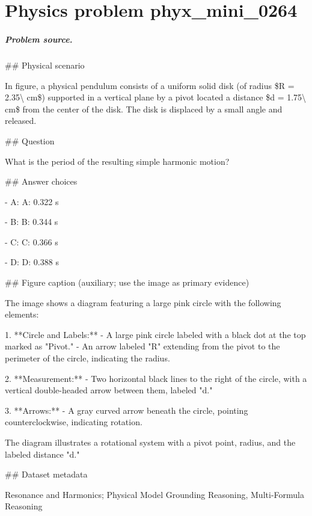 
\chapter{Physics problem phyx\_mini\_0264}
\label{ch:PhyXMiniProblems_problem_phyx_mini_0264}

\paragraph{Problem source.}
\#\# Physical scenario

In figure, a physical pendulum consists of a uniform solid disk (of radius \$R = 2.35\textbackslash{} cm\$) supported in a vertical plane by a pivot located a distance \$d = 1.75\textbackslash{} cm\$ from the center of the disk. The disk is displaced by a small angle and released.

\#\# Question

What is the period of the resulting simple harmonic motion?

\#\# Answer choices

- A: A: 0.322 s

- B: B: 0.344 s

- C: C: 0.366 s

- D: D: 0.388 s

\#\# Figure caption (auxiliary; use the image as primary evidence)

The image shows a diagram featuring a large pink circle with the following elements:

1. **Circle and Labels:**
   - A large pink circle labeled with a black dot at the top marked as "Pivot."
   - An arrow labeled "R" extending from the pivot to the perimeter of the circle, indicating the radius.

2. **Measurement:**
   - Two horizontal black lines to the right of the circle, with a vertical double-headed arrow between them, labeled "d."

3. **Arrows:**
   - A gray curved arrow beneath the circle, pointing counterclockwise, indicating rotation.

The diagram illustrates a rotational system with a pivot point, radius, and the labeled distance "d."

\#\# Dataset metadata

Resonance and Harmonics; Physical Model Grounding Reasoning, Multi-Formula Reasoning

